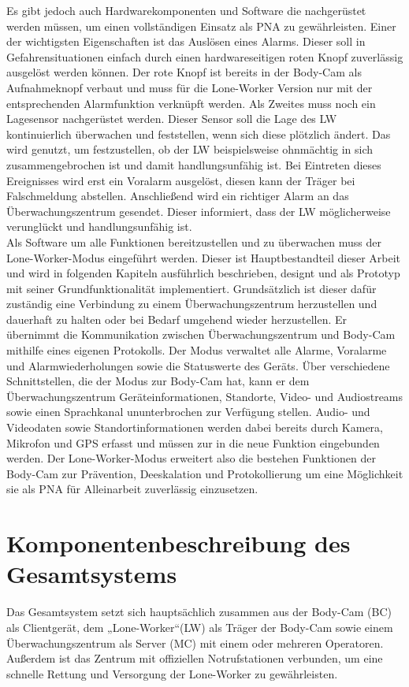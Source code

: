 \documentclass[thesis.tex]{subfiles}
\begin{document}
Es gibt jedoch auch Hardwarekomponenten und Software die nachgerüstet werden müssen, um einen vollständigen Einsatz als PNA zu gewährleisten.
Einer der wichtigsten Eigenschaften ist das Auslösen eines Alarms.
Dieser soll in Gefahrensituationen einfach durch einen hardwareseitigen roten Knopf zuverlässig ausgelöst werden können.
Der rote Knopf ist bereits in der Body-Cam als Aufnahmeknopf verbaut und muss für die Lone-Worker Version nur mit der entsprechenden Alarmfunktion verknüpft werden.
Als Zweites muss noch ein Lagesensor nachgerüstet werden.
Dieser Sensor soll die Lage des LW kontinuierlich überwachen und feststellen, wenn sich diese plötzlich ändert.
Das wird genutzt, um festzustellen, ob der LW beispielsweise ohnmächtig in sich zusammengebrochen ist und damit handlungsunfähig ist.
Bei Eintreten dieses Ereignisses wird erst ein Voralarm ausgelöst, diesen kann der Träger bei Falschmeldung abstellen.
Anschließend wird ein richtiger Alarm an das Überwachungszentrum gesendet.
Dieser informiert, dass der LW möglicherweise verunglückt und handlungsunfähig ist.
\\

Als Software um alle Funktionen bereitzustellen und zu überwachen muss der Lone-Worker-Modus eingeführt werden.
Dieser ist Hauptbestandteil dieser Arbeit und wird in folgenden Kapiteln ausführlich beschrieben, designt und als Prototyp mit seiner Grundfunktionalität  implementiert.
Grundsätzlich ist dieser dafür zuständig eine Verbindung zu einem Überwachungszentrum herzustellen und dauerhaft zu halten oder bei Bedarf umgehend wieder herzustellen.
Er übernimmt die Kommunikation zwischen Überwachungszentrum und Body-Cam mithilfe eines eigenen Protokolls.
Der Modus verwaltet alle Alarme, Voralarme und Alarmwiederholungen sowie die Statuswerte des Geräts.
Über verschiedene Schnittstellen, die der Modus zur Body-Cam hat, kann er dem Überwachungszentrum Geräteinformationen, Standorte, Video- und Audiostreams sowie einen Sprachkanal ununterbrochen zur Verfügung stellen.
Audio- und Videodaten sowie Standortinformationen werden dabei bereits durch Kamera, Mikrofon und GPS erfasst und müssen zur in die neue Funktion eingebunden werden.
Der Lone-Worker-Modus erweitert also die bestehen Funktionen der Body-Cam zur Prävention, Deeskalation und Protokollierung um eine Möglichkeit sie als PNA für Alleinarbeit zuverlässig einzusetzen.
\\

\section{Komponentenbeschreibung des Gesamtsystems}
Das Gesamtsystem setzt sich hauptsächlich zusammen aus der Body-Cam (BC) als Clientgerät, dem „Lone-Worker“(LW)
als Träger der Body-Cam sowie einem Überwachungszentrum als Server (MC) mit einem oder mehreren Operatoren.
Außerdem ist das Zentrum mit offiziellen Notrufstationen verbunden, um eine schnelle Rettung und Versorgung der Lone-Worker zu gewährleisten.
\\
\end{document}
